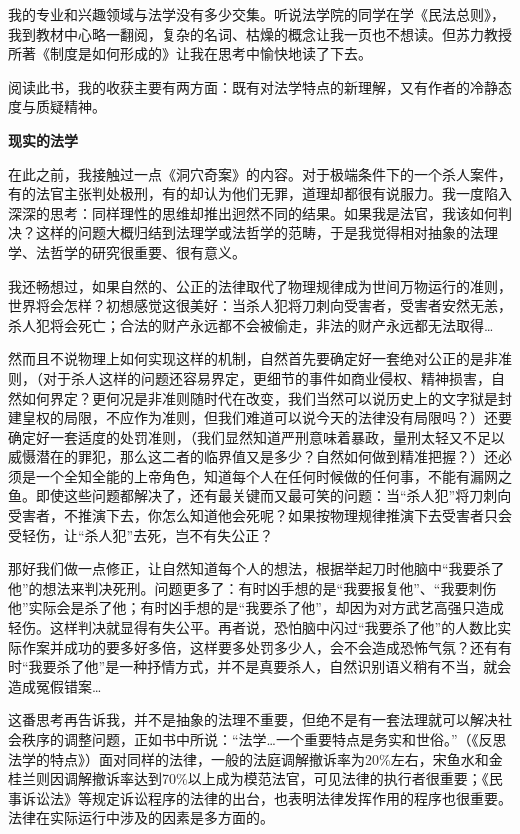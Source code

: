 \par 我的专业和兴趣领域与法学没有多少交集。听说法学院的同学在学《民法总则》，我到教材中心略一翻阅，复杂的名词、枯燥的概念让我一页也不想读。但苏力教授所著《制度是如何形成的》让我在思考中愉快地读了下去。
\par 阅读此书，我的收获主要有两方面：既有对法学特点的新理解，又有作者的冷静态度与质疑精神。
\par \textbf{现实的法学}
\par 在此之前，我接触过一点《洞穴奇案》的内容。对于极端条件下的一个杀人案件，有的法官主张判处极刑，有的却认为他们无罪，道理却都很有说服力。我一度陷入深深的思考：同样理性的思维却推出迥然不同的结果。如果我是法官，我该如何判决？这样的问题大概归结到法理学或法哲学的范畴，于是我觉得相对抽象的法理学、法哲学的研究很重要、很有意义。
\par 我还畅想过，如果自然的、公正的法律取代了物理规律成为世间万物运行的准则，世界将会怎样？初想感觉这很美好：当杀人犯将刀刺向受害者，受害者安然无恙，杀人犯将会死亡；合法的财产永远都不会被偷走，非法的财产永远都无法取得…
\par 然而且不说物理上如何实现这样的机制，自然首先要确定好一套绝对公正的是非准则，（对于杀人这样的问题还容易界定，更细节的事件如商业侵权、精神损害，自然如何界定？更何况是非准则随时代在改变，我们当然可以说历史上的文字狱是封建皇权的局限，不应作为准则，但我们难道可以说今天的法律没有局限吗？）还要确定好一套适度的处罚准则，（我们显然知道严刑意味着暴政，量刑太轻又不足以威慑潜在的罪犯，那么这二者的临界值又是多少？自然如何做到精准把握？）还必须是一个全知全能的上帝角色，知道每个人在任何时候做的任何事，不能有漏网之鱼。即使这些问题都解决了，还有最关键而又最可笑的问题：当“杀人犯”将刀刺向受害者，不推演下去，你怎么知道他会死呢？如果按物理规律推演下去受害者只会受轻伤，让“杀人犯”去死，岂不有失公正？
\par 那好我们做一点修正，让自然知道每个人的想法，根据举起刀时他脑中“我要杀了他”的想法来判决死刑。问题更多了：有时凶手想的是“我要报复他”、“我要刺伤他”实际会是杀了他；有时凶手想的是“我要杀了他”，却因为对方武艺高强只造成轻伤。这样判决就显得有失公平。再者说，恐怕脑中闪过“我要杀了他”的人数比实际作案并成功的要多好多倍，这样要多处罚多少人，会不会造成恐怖气氛？还有有时“我要杀了他”是一种抒情方式，并不是真要杀人，自然识别语义稍有不当，就会造成冤假错案…
\par 这番思考再告诉我，并不是抽象的法理不重要，但绝不是有一套法理就可以解决社会秩序的调整问题，正如书中所说：“法学…一个重要特点是务实和世俗。”（《反思法学的特点》）面对同样的法律，一般的法庭调解撤诉率为20\%左右，宋鱼水和金桂兰则因调解撤诉率达到70\%以上成为模范法官，可见法律的执行者很重要；《民事诉讼法》等规定诉讼程序的法律的出台，也表明法律发挥作用的程序也很重要。法律在实际运行中涉及的因素是多方面的。
